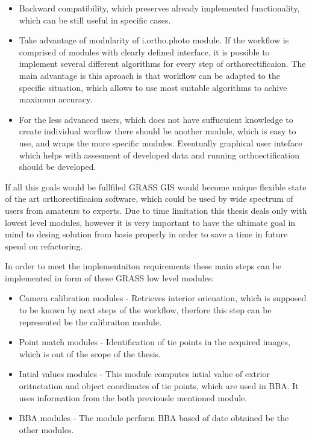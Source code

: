 \documentclass[a4paper,12pt]{report}
\begin{document}
\begin{itemize}
\item Backward compatibility, which preserves already implemented functionality, which
can be still useful in specific cases. 
\item Take advantage of modularity of i.ortho.photo module.
If the workflow is comprised of modules with clearly defined interface, it is possible to implement
several different algorithms for every step of orthorectificaion. The main advantage is this 
aproach is that workflow can be adapted to the specific situation, which allows to use 
most suitable algorithms to achive maximum accuracy.
\item For the less advanced users, which does not have suffucuient knowledge to create individual 
worflow there should be another module, which is easy to use, and wraps the more specific mudules.
Eventually graphical user inteface which helps with assesment of developed data and running orthoectification
should be developed. 
\end{itemize}

If all this goals would be fullfiled GRASS GIS would become unique flexible state of the art orthorectificaion 
software, which could be used by wide spectrum of users from amateurs to experts.
Due to time limitation this thesis deals only with lowest level modules, however it is very important to have 
the ultimate goal in mind to desing solution from basis properly in order to save a time in future spend 
on refactoring.

In order to meet the implementaiton requirements these main steps can be implemented in form 
of these GRASS low level modules:

\begin{itemize}
\item Camera calibration modules - Retrieves interior orienation, which is supposed to be known by 
next steps of the workflow, therfore this step can be represented be the calibraiton module.
\item Point match modules - Identification of tie points in the acquired images, which is out of the 
scope of the thesis.
\item Intial values modules - This module computes intial value of extrior oritnetation and 
object coordinates of tie points, which are used in BBA. It uses information from the both
previousle mentioned module.
\item BBA modules - The module perform BBA based of date obtained be the other modules.
\end{itemize}
\end{document}

